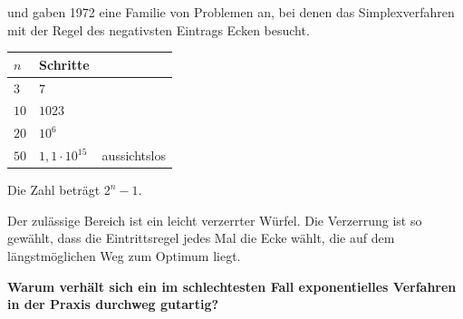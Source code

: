 \begin{warnung}
 und  gaben 1972 eine Familie von Problemen an, bei denen das Simplexverfahren mit der Regel des negativsten Eintrags  Ecken besucht.

\begin{center}
{\small
\renewcommand{\arraystretch}{1.48}
\begin{tabular}{@{}P{1.8cm}P{2.0cm}P{3.2cm}@{}}
\toprule
$n$ & \textbf{Schritte} & \\
\midrule
$3$ & $7$ & \\
$10$ & $1023$ & \\
$20$ & $10^{6}$ & \\
$50$ & $1{,}1\cdot10^{15}$ & \textcolor{akzent}{aussichtslos}\\
\bottomrule
\end{tabular}}
\end{center}

Die Zahl beträgt $2^{n}-1$.

Der zulässige Bereich ist ein leicht verzerrter Würfel. Die Verzerrung ist so gewählt, dass die Eintrittsregel jedes Mal die Ecke wählt, die auf dem längstmöglichen Weg zum Optimum liegt.

\begin{center}
\begin{minipage}{0.88\textwidth}
\end{minipage}
\end{center}

\begin{center}
\begin{minipage}{0.9\textwidth}
\textbf{Warum verhält sich ein im schlechtesten Fall exponentielles Verfahren in der Praxis durchweg gutartig?}
\end{minipage}
\end{center}

\begin{center}
\begin{minipage}{0.88\textwidth}
\end{minipage}
\end{center}
\end{warnung}

